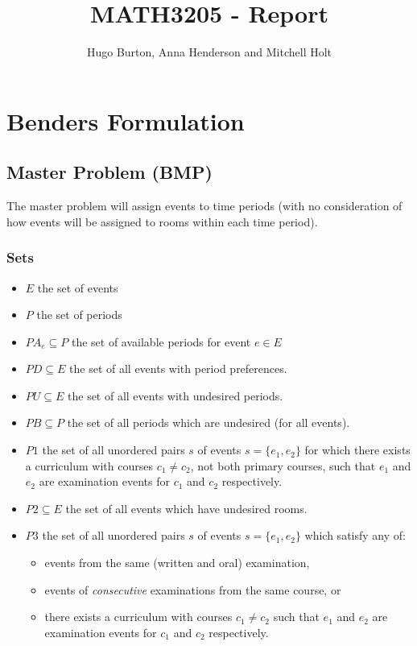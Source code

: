\documentclass{article}
\title{MATH3205 - Report}
\author{Hugo Burton, Anna Henderson and Mitchell Holt}
\theoremstyle{plain}
\numberwithin{theorem}{section}
\numberwithin{example}{section}
\theoremstyle{definition}
\begin{document}
\maketitle

\tableofcontents

\newpage

\section{Benders Formulation}
\subsection{Master Problem (BMP)}
The master problem will assign events to time periods (with no consideration of
how events will be assigned to rooms within each time period).

\subsubsection*{Sets}
\begin{itemize}
    \item $E$ the set of events
    \item $P$ the set of periods
    \item $PA_e \subseteq P$ the set of available periods for event $e \in E$
    \item $PD \subseteq E$ the set of all events with period preferences.
    \item $PU \subseteq E$ the set of all events with undesired periods.
    \item $PB \subseteq P$ the set of all periods which are undesired (for all
        events).
    \item $P1$ the set of all unordered pairs $s$ of events $s = \{e_1, e_2\}$
        for which there exists a curriculum with courses $c_1 \neq c_2$, not
        both primary courses, such that $e_1$ and $e_2$ are examination events
        for $c_1$ and $c_2$ respectively.
    \item $P2 \subseteq E$ the set of all events which have undesired rooms.
    \item $P3$ the set of all unordered pairs $s$ of events $s = \{e_1, e_2\}$
        which satisfy any of:
        \begin{itemize}
            \item events from the same (written and oral) examination,
            \item events of \emph{consecutive} examinations from the same
                course, or
            \item there exists a curriculum with courses $c_1 \neq c_2$ such
            that $e_1$ and $e_2$ are examination events for $c_1$ and $c_2$
            respectively.
        \end{itemize}
\end{itemize}
\end{document}
